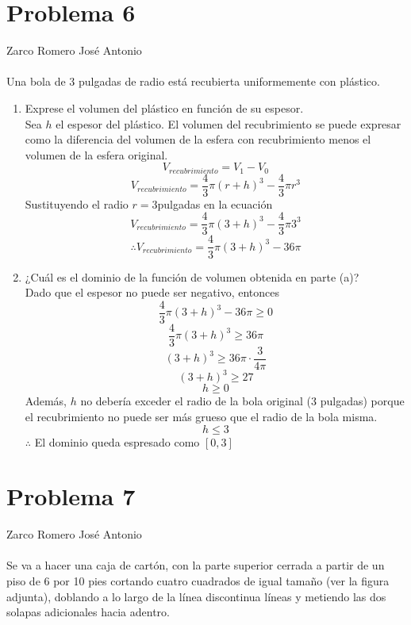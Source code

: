 \documentclass[12pt]{article}
\begin{document}
\section{Problema 6}
Zarco Romero José Antonio\\
\\
Una bola de 3 pulgadas de radio está recubierta uniformemente con plástico.
\begin{enumerate}[label=\alph*)]
\item  Exprese el volumen del plástico en función de su espesor.\\
Sea $h$ el espesor del plástico. El volumen del recubrimiento se puede expresar como la diferencia del volumen de la esfera con recubrimiento menos el volumen de la esfera original.
\[
V_{recubrimiento} = V_1 - V_0
\]
\[
V_{recubrimiento} = \frac{4}{3}\pi (r+h)^3 - \frac{4}{3}\pi r^3
\]
Sustituyendo el radio $r=3$pulgadas en la ecuación
\[
V_{recubrimiento} = \frac{4}{3}\pi (3+h)^3 - \frac{4}{3}\pi 3^3
\]
\[
\therefore V_{recubrimiento} = \frac{4}{3}\pi (3+h)^3 - 36\pi
\]

\item  ¿Cuál es el dominio de la función de volumen obtenida en parte (a)?\\
Dado que el espesor no puede ser negativo, entonces
\[
\frac{4}{3}\pi (3+h)^3 - 36\pi \geq 0
\]
\[
\frac{4}{3}\pi (3+h)^3 \geq 36\pi
\]
\[
(3+h)^3 \geq 36\pi \cdot \frac{3}{4\pi}
\]
\[
(3+h)^3 \geq 27
\]
\[
h \geq 0
\]
Además, $h$ no debería exceder el radio de la bola original (3 pulgadas) porque el recubrimiento no puede ser más grueso que el radio de la bola misma.
\[
h \leq 3
\]
$\therefore$ El dominio queda espresado como $[0,3]$
\end{enumerate}

\section{Problema 7}
Zarco Romero José Antonio\\
\\
Se va a hacer una caja de cartón, con la parte superior cerrada a partir de un piso de 6 por 10 pies cortando cuatro cuadrados de igual tamaño (ver la figura adjunta), doblando a lo largo de la línea discontinua
líneas y metiendo las dos solapas adicionales hacia adentro.
\end{document}
